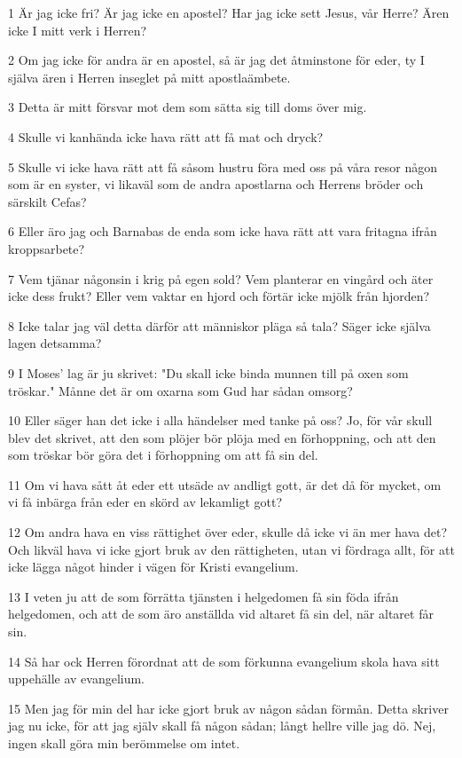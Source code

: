 \par 1 Är jag icke fri? Är jag icke en apostel? Har jag icke sett Jesus, vår Herre? Ären icke I mitt verk i Herren?
\par 2 Om jag icke för andra är en apostel, så är jag det åtminstone för eder, ty I själva ären i Herren inseglet på mitt apostlaämbete.
\par 3 Detta är mitt försvar mot dem som sätta sig till doms över mig.
\par 4 Skulle vi kanhända icke hava rätt att få mat och dryck?
\par 5 Skulle vi icke hava rätt att få såsom hustru föra med oss på våra resor någon som är en syster, vi likaväl som de andra apostlarna och Herrens bröder och särskilt Cefas?
\par 6 Eller äro jag och Barnabas de enda som icke hava rätt att vara fritagna ifrån kroppsarbete?
\par 7 Vem tjänar någonsin i krig på egen sold? Vem planterar en vingård och äter icke dess frukt? Eller vem vaktar en hjord och förtär icke mjölk från hjorden?
\par 8 Icke talar jag väl detta därför att människor pläga så tala? Säger icke själva lagen detsamma?
\par 9 I Moses' lag är ju skrivet: "Du skall icke binda munnen till på oxen som tröskar." Månne det är om oxarna som Gud har sådan omsorg?
\par 10 Eller säger han det icke i alla händelser med tanke på oss? Jo, för vår skull blev det skrivet, att den som plöjer bör plöja med en förhoppning, och att den som tröskar bör göra det i förhoppning om att få sin del.
\par 11 Om vi hava sått åt eder ett utsäde av andligt gott, är det då för mycket, om vi få inbärga från eder en skörd av lekamligt gott?
\par 12 Om andra hava en viss rättighet över eder, skulle då icke vi än mer hava det? Och likväl hava vi icke gjort bruk av den rättigheten, utan vi fördraga allt, för att icke lägga något hinder i vägen för Kristi evangelium.
\par 13 I veten ju att de som förrätta tjänsten i helgedomen få sin föda ifrån helgedomen, och att de som äro anställda vid altaret få sin del, när altaret får sin.
\par 14 Så har ock Herren förordnat att de som förkunna evangelium skola hava sitt uppehälle av evangelium.
\par 15 Men jag för min del har icke gjort bruk av någon sådan förmån. Detta skriver jag nu icke, för att jag själv skall få någon sådan; långt hellre ville jag dö. Nej, ingen skall göra min berömmelse om intet.
